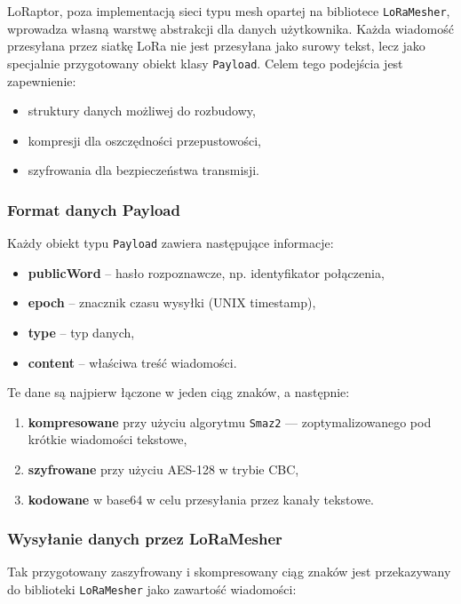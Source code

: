 LoRaptor, poza implementacją sieci typu mesh opartej na bibliotece \texttt{LoRaMesher}, wprowadza własną warstwę abstrakcji dla danych użytkownika. Każda wiadomość przesyłana przez siatkę LoRa nie jest przesyłana jako surowy tekst, lecz jako specjalnie przygotowany obiekt klasy \texttt{Payload}. Celem tego podejścia jest zapewnienie:

\begin{itemize}
	\item struktury danych możliwej do rozbudowy,
	\item kompresji dla oszczędności przepustowości,
	\item szyfrowania dla bezpieczeństwa transmisji.
\end{itemize}

\subsubsection{Format danych Payload}

Każdy obiekt typu \texttt{Payload} zawiera następujące informacje:
\begin{itemize}
	\item \textbf{publicWord} – hasło rozpoznawcze, np. identyfikator połączenia,
	\item \textbf{epoch} – znacznik czasu wysyłki (UNIX timestamp),
	\item \textbf{type} – typ danych,
	\item \textbf{content} – właściwa treść wiadomości.
\end{itemize}

Te dane są najpierw łączone w jeden ciąg znaków, a następnie:
\begin{enumerate}
	\item \textbf{kompresowane} przy użyciu algorytmu \texttt{Smaz2} — zoptymalizowanego pod krótkie wiadomości tekstowe,
	\item \textbf{szyfrowane} przy użyciu AES-128 w trybie CBC,
	\item \textbf{kodowane} w base64 w celu przesyłania przez kanały tekstowe.
\end{enumerate}

\clearpage
\subsubsection{Wysyłanie danych przez LoRaMesher}

Tak przygotowany zaszyfrowany i skompresowany ciąg znaków jest przekazywany do biblioteki \texttt{LoRaMesher} jako zawartość wiadomości:

